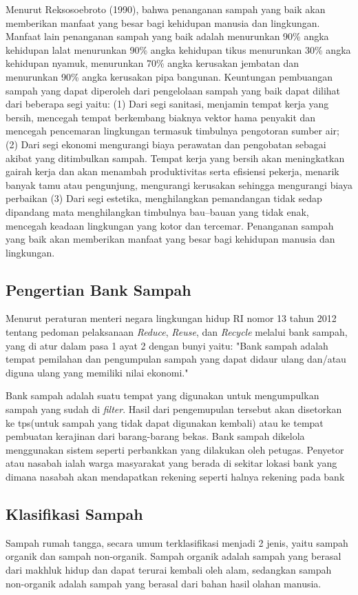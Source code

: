 Menurut Reksosoebroto (1990), bahwa penanganan sampah yang baik akan memberikan manfaat yang besar bagi kehidupan manusia dan lingkungan. Manfaat lain penanganan sampah yang baik adalah menurunkan 90\% angka kehidupan lalat menurunkan 90\% angka kehidupan tikus menurunkan 30\% angka kehidupan nyamuk, menurunkan 70\% angka kerusakan jembatan dan menurunkan 90\% angka kerusakan pipa bangunan. Keuntungan pembuangan sampah yang dapat diperoleh dari pengelolaan sampah yang baik dapat dilihat dari beberapa segi yaitu: (1) Dari segi sanitasi, menjamin tempat kerja yang bersih, mencegah tempat berkembang biaknya vektor hama penyakit dan mencegah pencemaran lingkungan termasuk timbulnya pengotoran sumber air; (2) Dari segi ekonomi mengurangi biaya perawatan dan pengobatan sebagai akibat yang ditimbulkan sampah. Tempat kerja yang bersih akan meningkatkan gairah kerja dan akan menambah produktivitas serta efisiensi pekerja, menarik banyak tamu atau pengunjung, mengurangi kerusakan sehingga mengurangi biaya perbaikan (3) Dari segi estetika, menghilangkan pemandangan tidak sedap dipandang mata menghilangkan timbulnya bau–bauan yang tidak enak, mencegah keadaan lingkungan yang kotor dan tercemar. Penanganan sampah yang baik akan memberikan manfaat yang besar bagi kehidupan manusia dan lingkungan.

\subsection{Pengertian Bank Sampah}
Menurut peraturan menteri negara lingkungan hidup RI nomor 13 tahun 2012 tentang pedoman pelaksanaan \textit{Reduce}, \textit{Reuse}, dan \textit{Recycle} melalui bank sampah, yang di atur dalam pasa 1 ayat 2 dengan bunyi yaitu: "Bank sampah adalah tempat pemilahan dan pengumpulan sampah yang dapat didaur ulang dan/atau diguna ulang yang memiliki nilai ekonomi."

Bank sampah adalah suatu tempat yang digunakan untuk mengumpulkan sampah yang sudah di \textit{filter}. Hasil dari pengemupulan tersebut akan disetorkan ke tps(untuk sampah yang tidak dapat digunakan kembali) atau ke tempat pembuatan kerajinan dari barang-barang bekas. Bank sampah dikelola menggunakan sistem seperti perbankkan yang dilakukan oleh petugas. Penyetor atau nasabah ialah warga masyarakat yang berada di sekitar lokasi bank yang dimana nasabah akan mendapatkan rekening seperti halnya rekening pada bank

\subsection{Klasifikasi Sampah}
Sampah rumah tangga, secara umum terklasifikasi menjadi 2 jenis, yaitu sampah organik dan sampah non-organik. Sampah organik adalah sampah yang berasal dari makhluk hidup dan dapat terurai kembali oleh alam, sedangkan sampah non-organik adalah sampah yang berasal dari bahan hasil olahan manusia.


